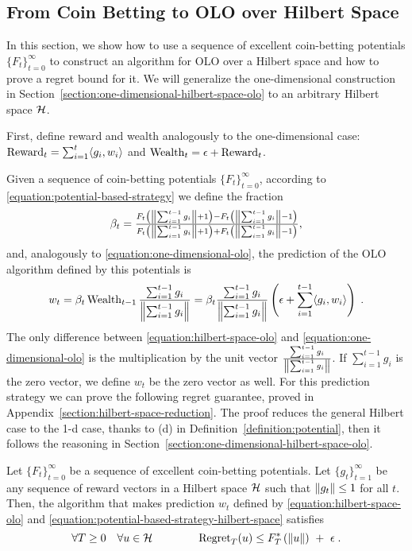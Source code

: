 \subsection{From Coin Betting to OLO over Hilbert Space}
\label{section:reduction_hilbert}

In this section, we show how to use a sequence of excellent coin-betting
potentials $\{F_t\}_{t=0}^\infty$ to construct an algorithm for \ac{OLO} over a
Hilbert space and how to prove a regret bound for it.  We will generalize the
one-dimensional construction in
Section~\ref{section:one-dimensional-hilbert-space-olo} to an arbitrary Hilbert
space $\mathcal{H}$.

First, define reward and wealth analogously to the one-dimensional case:
$\operatorname{Reward}_t = \sum_{i=1}^t \langle g_i, w_i \rangle$ and $\operatorname{Wealth}_t = \epsilon +
\operatorname{Reward}_t$.

Given a sequence of coin-betting potentials $\{F_t\}_{t=0}^\infty$, according
to \eqref{equation:potential-based-strategy} we define the fraction
\begin{equation}
\label{equation:potential-based-strategy-hilbert-space}
\beta_t = \tfrac{F_t \left(\left\|{\sum_{i=1}^{t-1} g_i}\right\| + 1\right) - F_t\left(\left\|{\sum_{i=1}^{t-1} g_i}\right\| - 1 \right)}{F_t\left(\left\|{\sum_{i=1}^{t-1} g_i}\right\| + 1 \right) + F_t\left(\left\|{\sum_{i=1}^{t-1} g_i}\right\| - 1 \right)},
\end{equation}
and, analogously to \eqref{equation:one-dimensional-olo}, the prediction of the OLO algorithm
defined by this potentials is
\begin{equation}
\label{equation:hilbert-space-olo}
w_t = \beta_t \operatorname{Wealth}_{t-1} \frac{\sum_{i=1}^{t-1} g_i}{\left\|{\sum_{i=1}^{t-1} g_i}\right\|}
= \beta_t \frac{\sum_{i=1}^{t-1} g_i}{\left\|{\sum_{i=1}^{t-1} g_i}\right\|} \left(\epsilon+ \sum_{i=1}^{t-1} \langle g_i, w_i\rangle \right) \; .
\end{equation}
The only difference between \eqref{equation:hilbert-space-olo} and
\eqref{equation:one-dimensional-olo} is the multiplication by the unit vector
$\frac{\sum_{i=1}^{t-1} g_i}{\left\|{\sum_{i=1}^{t-1} g_i}\right\|}$. If $\sum_{i=1}^{t-1}
g_i$ is the zero vector, we define $w_t$ be the zero vector as well.  For this
prediction strategy we can prove the following regret guarantee, proved in
Appendix~\ref{section:hilbert-space-reduction}.  The proof reduces the general
Hilbert case to the 1-d case, thanks to (d) in
Definition~\ref{definition:potential}, then it follows the  reasoning in
Section~\ref{section:one-dimensional-hilbert-space-olo}.
%
\begin{theorem}
\label{theorem:hilbert-space-olo-regret-bound}
Let $\{F_t\}_{t=0}^\infty$ be a sequence of excellent coin-betting potentials.
Let $\{g_t\}_{t=1}^\infty$ be any sequence of reward vectors in a Hilbert space
$\mathcal{H}$ such that $\left\|{g_t}\right\| \le 1$ for all $t$. Then, the algorithm that makes
prediction $w_t$ defined by \eqref{equation:hilbert-space-olo} and
\eqref{equation:potential-based-strategy-hilbert-space} satisfies
\[
\forall T \ge 0 \quad
\forall u \in \mathcal{H} \qquad \qquad
\operatorname{Regret}_T(u) \le F_T^*\left(\left\|{u}\right\| \right) \ + \ \epsilon \; .
\]
\end{theorem}
